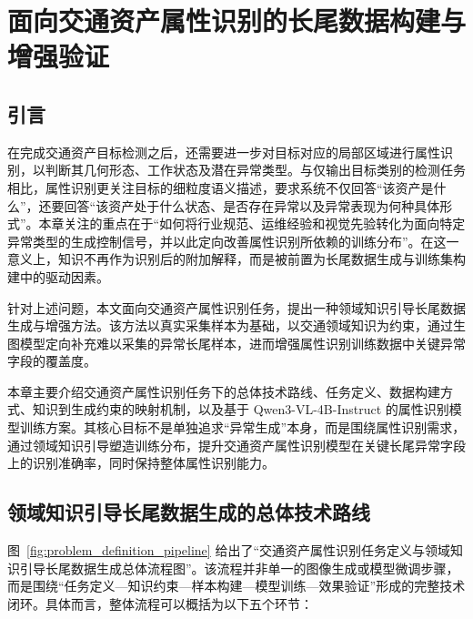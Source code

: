 
\chapter{面向交通资产属性识别的长尾数据构建与增强验证}

\section{引言}

在完成交通资产目标检测之后，还需要进一步对目标对应的局部区域进行属性识别，以判断其几何形态、工作状态及潜在异常类型。与仅输出目标类别的检测任务相比，属性识别更关注目标的细粒度语义描述，要求系统不仅回答“该资产是什么”，还要回答“该资产处于什么状态、是否存在异常以及异常表现为何种具体形式”。本章关注的重点在于“如何将行业规范、运维经验和视觉先验转化为面向特定异常类型的生成控制信号，并以此定向改善属性识别所依赖的训练分布”。在这一意义上，知识不再作为识别后的附加解释，而是被前置为长尾数据生成与训练集构建中的驱动因素。

针对上述问题，本文面向交通资产属性识别任务，提出一种领域知识引导长尾数据生成与增强方法。该方法以真实采集样本为基础，以交通领域知识为约束，通过生图模型定向补充难以采集的异常长尾样本，进而增强属性识别训练数据中关键异常字段的覆盖度。

本章主要介绍交通资产属性识别任务下的总体技术路线、任务定义、数据构建方式、知识到生成约束的映射机制，以及基于 Qwen3-VL-4B-Instruct 的属性识别模型训练方案。其核心目标不是单独追求“异常生成”本身，而是围绕属性识别需求，通过领域知识引导塑造训练分布，提升交通资产属性识别模型在关键长尾异常字段上的识别准确率，同时保持整体属性识别能力。

\section{领域知识引导长尾数据生成的总体技术路线}

图~\ref{fig:problem_definition_pipeline} 给出了“交通资产属性识别任务定义与领域知识引导长尾数据生成总体流程图”。该流程并非单一的图像生成或模型微调步骤，而是围绕“任务定义—知识约束—样本构建—模型训练—效果验证”形成的完整技术闭环。具体而言，整体流程可以概括为以下五个环节：

